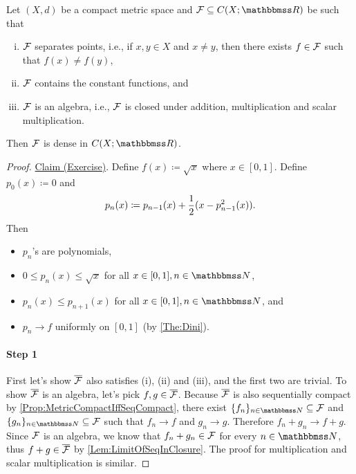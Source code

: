 \documentclass[screen,single]{techreport}
\numberwithin{equation}{section}
\begin{document}
\begin{theorem}[Stone]\label{The:Stone}
  Let $(X,d)$ be a compact metric space and $\calF \subseteq C(X;\bbR)$ be such that
  \begin{enumerate}[(i)]
    \item $\mathcal{F}$ separates points, i.e., if $x,y\in X$ and $x \neq y$, then there exists $f \in \mathcal{F}$ such that $f(x) \neq f(y)$,
    \item $\mathcal{F}$ contains the constant functions, and
    \item $\mathcal{F}$ is an algebra, i.e., $\mathcal{F}$ is closed under addition, multiplication and scalar multiplication.
  \end{enumerate}
  Then $\mathcal{F}$ is dense in $C(X;\bbR)$.
\end{theorem}
\begin{proof}
  \underline{Claim (Exercise)}. Define $f(x) \coloneqq \sqrt{x}$ where $x \in [0,1]$.
  Define $p_0(x) \coloneqq 0$ and
  \[
  p_n(x) \coloneqq p_{n-1}(x) + \frac{1}{2}({ x - p_{n-1}^2(x) }).
  \]
  Then
  \begin{itemize}
    \item $p_n$'s are polynomials,
    \item $0 \le p_n(x) \le \sqrt{x}$ for all $x \in [0,1], n \in \bbN$,
    \item $p_n(x) \le p_{n+1}(x)$ for all $x \in [0,1], n \in \bbN$, and
    \item $p_n \rightarrow f$ uniformly on $[0,1]$ (by \cref{The:Dini}). 
  \end{itemize}
  
  \paragraph{Step 1} First let's show $\overline{\mathcal{F}}$ also satisfies (i), (ii) and (iii), and the first two are trivial.
  To show $\overline{\mathcal{F}}$ is an algebra, let's pick $f,g \in \overline{\mathcal{F}}$.
  Because $\overline{\mathcal{F}}$ is also sequentially compact by \cref{Prop:MetricCompactIffSeqCompact}, there exist $\{f_n\}_{n \in \bbN} \subseteq \calF$ and $\{g_n\}_{n \in \bbN} \subseteq \calF$ such that $f_n \rightarrow f$ and $g_n \rightarrow g$.
  Therefore $f_n + g_n \rightarrow f + g$.
  Since $\mathcal{F}$ is an algebra, we know that $f_n + g_n \in \mathcal{F}$ for every $n \in \bbN$, thus $f+g \in \overline{\mathcal{F}}$ by \cref{Lem:LimitOfSeqInClosure}.
  The proof for multiplication and scalar multiplication is similar.
  

\end{proof}
\end{document}
